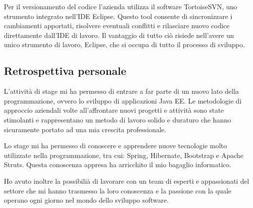 \setlength{\parskip}{3ex}

\noindent Per il versionamento del codice l'azienda utilizza il software TortoiseSVN, uno strumento integrato nell'IDE Eclipse. Questo tool consente di sincronizzare i cambiamenti apportati, risolvere eventuali conflitti e rilasciare nuovo codice direttamente dall'IDE di lavoro. Il vantaggio di tutto ciò risiede nell'avere un unico strumento di lavoro, Eclipse, che si occupa di tutto il processo di sviluppo.

\subsection{Retrospettiva personale}
L'attività di stage mi ha permesso di entrare a far parte di un nuovo lato della programmazione, ovvero lo sviluppo di applicazioni Java EE. Le metodologie di approccio aziendali volte all'affrontare nuovi progetti e attività sono state stimolanti e rappresentano un metodo di lavoro solido e duraturo che hanno sicuramente portato ad una mia crescita professionale. 

\setlength{\parskip}{3ex}

\noindent Lo stage mi ha permesso di conoscere e apprendere nuove tecnologie molto utilizzate nella programmazione, tra cui: Spring, Hibernate, Bootstrap e Apache Struts. Questa conoscenza appresa ha arricchito il mio bagaglio informatico.

\setlength{\parskip}{3ex}

\noindent Ho avuto inoltre la possibilià di lavorare con un team di esperti e appassionati del settore che mi hanno trasmesso la loro conoscenza e la passione con la quale operano ogni giorno nel mondo dello sviluppo software.